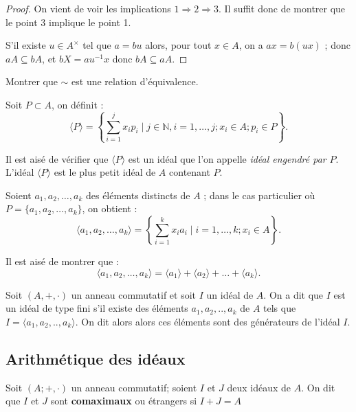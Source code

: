 \begin{proof}
     On vient de voir les implications $1 \Rightarrow 2 \Rightarrow 3$. Il suffit donc de montrer que le point 3 implique le point 1.

S'il existe $u \in A^{\times}$ tel que $a = bu$ alors, pour tout $x \in A$, on a $ax = b(ux)$ ; donc $aA \subseteq bA$, et $bX = au^{-1}x$ donc $bA \subseteq aA$.
\end{proof}
\begin{exercice}
    Montrer que $\sim$ est une relation d'équivalence.
\end{exercice}


    \begin{definition}
        Soit $P \subset A$, on définit :
\[
\langle P \rangle = \left\{ \sum_{i=1}^{j} x_i p_i \mid j \in \mathbb{N}, i = 1, \dots, j; x_i \in A; p_i \in P \right\}.
\]
    \end{definition}

Il est aisé de vérifier que $\langle P \rangle$ est un idéal que l'on appelle \textit{idéal engendré par} $P$.
L'idéal $\langle P \rangle$ est le plus petit idéal de $A$ contenant $P$.

Soient $a_1, a_2, \dots, a_k$ des éléments distincts de $A$ ; dans le cas particulier où $P = \{a_1, a_2, \dots, a_k\}$, on obtient :
\[
\langle a_1, a_2, \dots, a_k \rangle = \left\{ \sum_{i=1}^{k} x_i a_i \mid i = 1, \dots, k; x_i \in A \right\}.
\]

Il est aisé de montrer que :
\[
\langle a_1, a_2, \dots, a_k \rangle = \langle a_1 \rangle + \langle a_2 \rangle + \dots + \langle a_k \rangle.
\]

    \begin{definition}
        Soit $(A,+,\cdot)$ un anneau commutatif et soit $I$ un idéal de $A$. On a dit que $I$ est un idéal de type fini s'il existe des éléments $a_1,a_2,..,a_k$ de $A$ tels que $I=\langle a_1,a_2,..,a_k\rangle$. On dit alors alors ces éléments sont des générateurs de l'idéal $I$.
    \end{definition}

\subsection{Arithmétique des idéaux}


    \begin{definition}
        Soit $(A;+,\cdot)$ un anneau commutatif; soient $I$ et $J$ deux idéaux de $A$. On dit que $I$ et $J$ sont \textbf{comaximaux} ou étrangers si $I+J=A$
    \end{definition}

